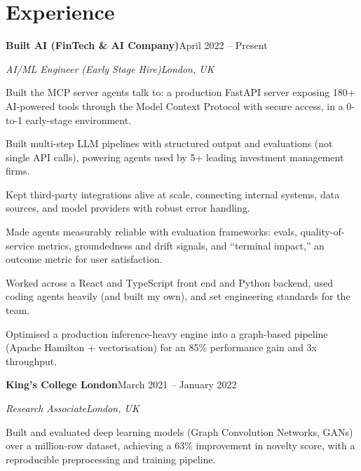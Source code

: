 \documentclass[10pt,a4paper]{article}
\newcommand{\entry}[4]{%
  {\color{company}\bfseries #1}\hfill {\color{muted}#2}\par
  \vspace{1pt}
  {\itshape #3}\hfill {\color{muted}\itshape #4}\par
  \vspace{3pt}%
}
\begin{document}
\section{Experience}
\entry{Built AI (FinTech \& AI Company)}{April 2022 -- Present}{AI/ML Engineer (Early Stage Hire)}{London, UK}
\begin{tight}
  \item Built the MCP server agents talk to: a production FastAPI server exposing 180+ AI-powered tools through the Model Context Protocol with secure access, in a 0-to-1 early-stage environment.
  \item Built multi-step LLM pipelines with structured output and evaluations (not single API calls), powering agents used by 5+ leading investment management firms.
  \item Kept third-party integrations alive at scale, connecting internal systems, data sources, and model providers with robust error handling.
  \item Made agents measurably reliable with evaluation frameworks: evals, quality-of-service metrics, groundedness and drift signals, and ``terminal impact,'' an outcome metric for user satisfaction.
  \item Worked across a React and TypeScript front end and Python backend, used coding agents heavily (and built my own), and set engineering standards for the team.
  \item Optimised a production inference-heavy engine into a graph-based pipeline (Apache Hamilton + vectorisation) for an 85\% performance gain and 3x throughput.
\end{tight}

\entry{King's College London}{March 2021 -- January 2022}{Research Associate}{London, UK}
\begin{tight}
  \item Built and evaluated deep learning models (Graph Convolution Networks, GANs) over a million-row dataset, achieving a 63\% improvement in novelty score, with a reproducible preprocessing and training pipeline.
\end{tight}

\end{document}
